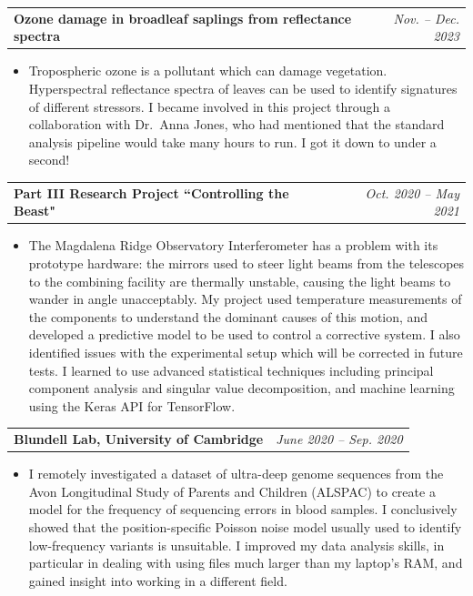 \documentclass[a4paper,11pt]{article}
\makeatletter
\newcommand{\resumeSubheading}[2]{
  \vspace{-2pt}\item
    \begin{tabular*}{0.97\textwidth}[t]{l@{\extracolsep{\fill}}r}
      \textbf{#1} & \textit{#2} \\
    \end{tabular*}\vspace{-7pt}
}
\newcommand{\resumeItemListStart}{\begin{itemize}\setlength\itemsep{1pt}}
\newcommand{\resumeItemListEnd}{\vspace{-5pt}\end{itemize}}
\makeatother
\begin{document}
    \resumeSubheading
      {Ozone damage in broadleaf saplings from reflectance spectra}{Nov. -- Dec. 2023}
      \resumeItemListStart
        \item[]
          Tropospheric ozone is a pollutant which can damage vegetation.
          Hyperspectral reflectance spectra of leaves can be used to identify signatures of different stressors.
          I became involved in this project through a collaboration with Dr.~Anna Jones, who had mentioned that the standard analysis pipeline would take many hours to run.
          I got it down to under a second!
      \resumeItemListEnd
  
    \resumeSubheading
      {Part III Research Project ``Controlling the Beast"}{Oct. 2020 -- May 2021}
      \resumeItemListStart
        \item[]
        The Magdalena Ridge Observatory Interferometer has a problem with its prototype hardware: the mirrors used to steer light beams from the telescopes to the combining facility are thermally unstable, causing the light beams to wander in angle unacceptably. My project used temperature measurements of the components to understand the dominant causes of this motion, and developed a predictive model to be used to control a corrective system. I also identified issues with the experimental setup which will be corrected in future tests. I learned to use advanced statistical techniques including principal component analysis and singular value decomposition, and machine learning using the Keras API for TensorFlow.
      \resumeItemListEnd

    \resumeSubheading
      {Blundell Lab, University of Cambridge}{June 2020 -- Sep. 2020}
      \resumeItemListStart
        \item[]
        I remotely investigated a dataset of ultra-deep genome sequences from the Avon Longitudinal Study of Parents and Children (ALSPAC) to create a model for the frequency of sequencing errors in blood samples. I conclusively showed that the position-specific Poisson noise model usually used to identify low-frequency variants is unsuitable. I improved my data analysis skills, in particular in dealing with using files much larger than my laptop's RAM, and gained insight into working in a different field.
      \resumeItemListEnd
      
\end{document}
